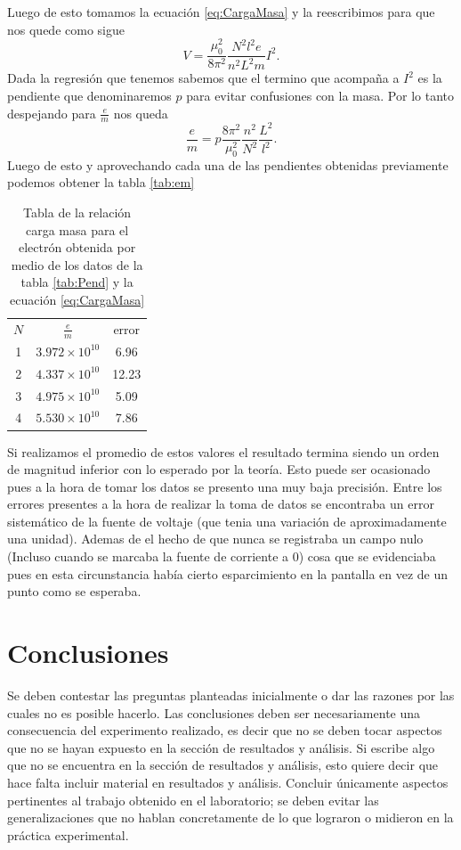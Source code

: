 \documentclass[a4paper, amsfonts, amssymb, amsmath, reprint, showkeys, nofootinbib, twoside]{revtex4-1}
\begin{document}
Luego de esto tomamos la ecuación \ref{eq:CargaMasa} y la reescribimos para que nos quede como sigue \[
V = \frac{\mu_0^2}{8\pi^2}\frac{N^2 l^2 e}{n^2 L^2 m}I^2
.\] Dada la regresión que tenemos sabemos que el termino que acompaña a $I^2$ es la pendiente que denominaremos $p$ para evitar confusiones con la masa. Por lo tanto despejando para  $\frac{e}{m}$ nos queda \[
\frac{e}{m}=p \frac{8\pi^2}{\mu_0^2}\frac{n^2}{N^2}\frac{L^2}{l^2}
.\] Luego de esto y aprovechando cada una de las pendientes obtenidas previamente podemos obtener la tabla \ref{tab:em}
\begin{table}[htpb]
  \centering
  \caption{Tabla de la relación carga masa para el electrón obtenida por medio de los datos de la tabla \ref{tab:Pend} y la ecuación \ref{eq:CargaMasa}}
  \label{tab:label}
  \begin{tabular}{|c|c|c|}
    \hline
    $N$ &  $\frac{e}{m}$ & error \\
    1 & $3.972\times 10^{10}$ & 6.96 \\
    2 & $4.337\times 10^{10}$ & 12.23 \\
    3 & $4.975\times 10^{10}$ & 5.09 \\
    4 & $5.530\times 10^{10}$ & 7.86\\
  \end{tabular}
\end{table}
Si realizamos el promedio de estos valores el resultado termina siendo un orden de magnitud inferior con lo esperado por la teoría. Esto puede ser ocasionado pues a la hora de tomar los datos se presento una muy baja precisión. Entre los errores presentes a la hora de realizar la toma de datos se encontraba un error sistemático de la fuente de voltaje (que tenia una variación de aproximadamente una unidad). Ademas de el hecho de que nunca se registraba un campo nulo (Incluso cuando se marcaba la fuente de corriente a 0) cosa que se evidenciaba pues en esta circunstancia había cierto esparcimiento en la pantalla en vez de un punto como se esperaba.

\section{Conclusiones}

Se deben contestar las preguntas planteadas inicialmente o dar las razones por las cuales no es posible hacerlo. Las conclusiones deben ser necesariamente una consecuencia del experimento realizado, es  decir  que  no  se  deben  tocar  aspectos  que  no  se  hayan  expuesto  en  la  sección  de resultados y análisis. Si escribe algo que no se encuentra en la sección de resultados y análisis,  esto quiere decir que hace falta incluir material en resultados y análisis. Concluir únicamente aspectos pertinentes al trabajo obtenido en el laboratorio; se deben evitar las generalizaciones que no hablan concretamente de lo que lograron o midieron en la práctica experimental. 
\end{document}
